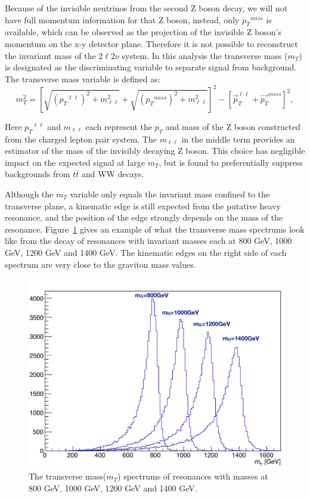 \vspace{0.3cm}
Because of the invisible neutrinos from the second Z boson decay, we will not have full momentum information for that Z boson, instead, only ${p_{T}}^{miss}$ is available, which can be observed as the projection of the invisible Z boson's momentum on the x-y detector plane. Therefore it is not possible to reconstruct the invariant mass of the $2\ell 2\nu$ system. In this analysis the transverse mass ($m_{T}$) is designated as the discriminating variable to separate signal from background. The transverse mass variable is defined as:
\begin{equation}
m_{T}^2 = \left[ \sqrt{({p_{T}}^{\ell\ell})^2 + m^2_{\ell\ell}}
      + \sqrt{({p_{T}}^{miss})^2+m^2_{\ell\ell}}\right]^2
      - \left[\vec{p}_{T}^{\ell\ell}+\vec{p_{T}}^{miss}\right]^2,
\label{eqn:intro_MT}
\end{equation}

Here ${p_{T}}^{\ell\ell}$ and $m_{\ell\ell}$ each represent the $p_{T}$ and mass of the Z boson constructed from the charged lepton pair system. The $m_{\ell\ell}$ in the middle term provides an estimator of the mass of the invisibly decaying Z boson. This choice has negligible impact on the expected signal at large $m_{T}$, but is found to preferentially suppress backgrounds from $t\bar{t}$ and WW decays.

\vspace{0.3cm}
Although the $m_{T}$ variable only equals the invariant mass confined to the transverse plane, a kinematic edge is still expected from the putative heavy resonance, and the position of the edge strongly depends on the mass of the resonance. Figure~\ref{fig:intro_mt} gives an example of what the transverse mass spectrums look like from the decay of resonances with invariant masses each at 800 GeV, 1000 GeV, 1200 GeV and 1400 GeV. The kinematic edges on the right side of each spectrum are very close to the graviton mass values.

\begin{figure}[htbp]
\begin{center}
\includegraphics[width=0.72\linewidth]{figures/intro_example_mt.pdf}
\caption{The transverse mass($m_{T}$) spectrums of resonances with masses at 800 GeV, 1000 GeV, 1200 GeV and 1400 GeV.}
\label{fig:intro_mt}
\end{center}
\end{figure}

